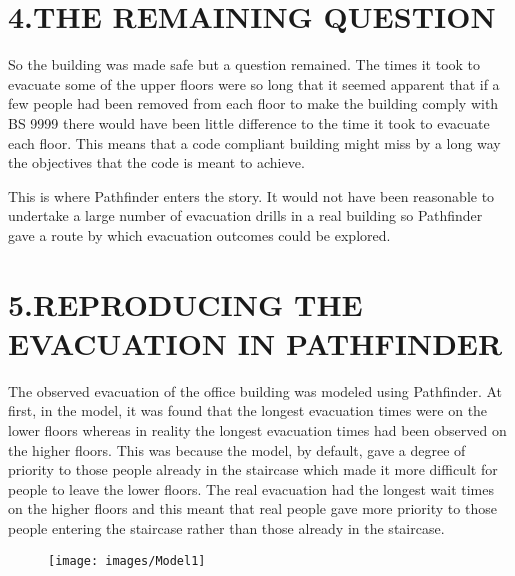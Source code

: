 \documentclass{style/llncs}
\begin{document}
\section{4.\hspace*{0.5em}THE REMAINING QUESTION}\label{sec-the-remaining-question}%

\noindent{}So the building was made safe but a question remained.  The times it took to evacuate some of the upper floors were so long that it seemed apparent that if a few people had been removed from each floor to make the building comply with BS 9999 there would have been little difference to the time it took to evacuate each floor.  This means that a code compliant building might miss by a long way the objectives that the code is meant to achieve.%

This is where Pathfinder enters the story.  It would not have been reasonable to undertake a large number of evacuation drills in a real building so Pathfinder gave a route by which evacuation outcomes could be explored.%

\section{5.\hspace*{0.5em}REPRODUCING THE EVACUATION IN PATHFINDER}\label{sec-reproducing-the-evacuation-in-pathfinder}%

\noindent{}The observed evacuation of the office building was modeled using Pathfinder.  At first, in the model, it was found that the longest evacuation times were on the lower floors whereas in reality the longest evacuation times had been observed on the higher floors.  This was because the model, by default, gave a degree of priority to those people already in the staircase which made it more difficult for people to leave the lower floors.  The real evacuation had the longest wait times on the higher floors and this meant that real people gave more priority to those people entering the staircase rather than those already in the staircase.%

\begin{figure}[tbp]%
\begin{mdcenter}%

\noindent{}\texttt{[image: images/Model1]}{}%

\mdhr{}%

\noindent{}%
\end{mdcenter}\label{fig-4}%
\end{figure}%
\end{document}
